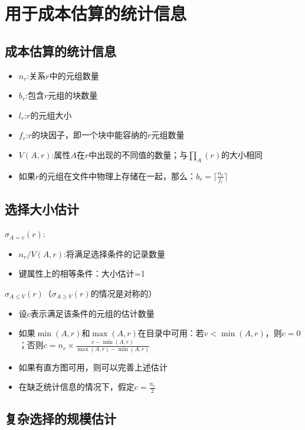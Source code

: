 \section{用于成本估算的统计信息}

\subsection{成本估算的统计信息}
\begin{itemize}
    \item $n_r$:关系$r$中的元组数量
    \item $b_r$:包含$r$元组的块数量
    \item $l_r$:$r$的元组大小
    \item $f_r$:$r$的块因子，即一个块中能容纳的$r$元组数量
    \item $V(A,r)$:属性$A$在$r$中出现的不同值的数量；与$\prod_{A}(r)$的大小相同
    \item 如果$r$的元组在文件中物理上存储在一起，那么：$b_r=\lceil \frac{n_r}{f_r} \rceil$
\end{itemize}

\subsection{选择大小估计}

\noindent $\sigma_{A=v}(r)$:
\begin{itemize}
    \item $n_r/V(A,r)$:将满足选择条件的记录数量
    \item 键属性上的相等条件：大小估计=1
\end{itemize}

\noindent $\sigma_{A\leq V}(r)$（$\sigma_{A\geq V}(r)$的情况是对称的）
\begin{itemize}
    \item 设$c$表示满足该条件的元组的估计数量
    \item 如果$\min(A,r)$和$\max(A,r)$在目录中可用：若$v<\min(A,r)$，则$c=0$；否则$c=n_r\times \frac{v-\min(A,r)}{\max(A,r)-\min(A,r)}$
    \item 如果有直方图可用，则可以完善上述估计
    \item 在缺乏统计信息的情况下，假定$c=\frac{n_r}{2}$
\end{itemize}

\subsection{复杂选择的规模估计}

